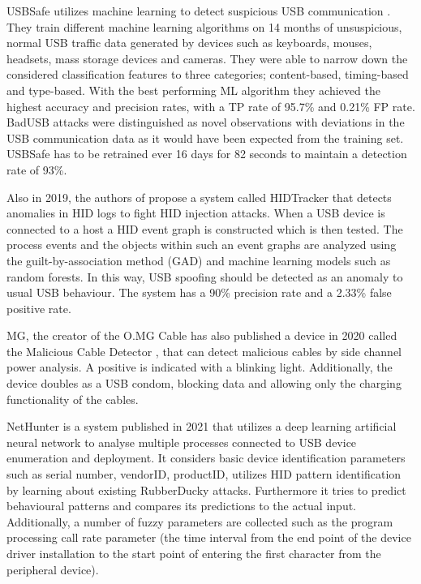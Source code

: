 USBSafe utilizes machine learning to detect suspicious USB communication \cite{kharrazUSBESAFEEndPointSolution2019}. They train different machine learning algorithms on 14 months of unsuspicious, normal USB traffic data generated by devices such as keyboards, mouses, headsets, mass storage devices and cameras. They were able to narrow down the considered classification features to three categories; content-based, timing-based and type-based. With the best performing ML algorithm they achieved the highest accuracy and precision rates, with a TP rate of 95.7\% and 0.21\% FP rate. BadUSB attacks were distinguished as novel observations with deviations in the USB communication data as it would have been expected from the training set. 
USBSafe has to be retrained ever 16 days for 82 seconds to maintain a detection rate of 93\%.

Also in 2019, the authors of \cite{IdentifyingHIDbasedAttacks2019} propose a system called HIDTracker that detects anomalies in HID logs to fight HID injection attacks. When a USB device is connected to a host a HID event graph is constructed which is then tested. The process events and the objects within such an event graphs are analyzed using the guilt-by-association method (GAD) and machine learning models such as random forests. In this way, USB spoofing should be detected as an anomaly to usual USB behaviour. The system has a 90\% precision rate and a 2.33\% false positive rate. 

MG, the creator of the O.MG Cable has also published a device in 2020 called the Malicious Cable Detector \cite{hak5MaliciousCableDetector}, that can detect malicious cables by side channel power analysis. A positive is indicated with a blinking light. Additionally, the device doubles as a USB condom, blocking data and allowing only the charging functionality of the cables. 

NetHunter \cite{IntelligentSystemPreventing} is a system published in 2021 that utilizes a deep learning artificial neural network to analyse multiple processes connected to USB device enumeration and deployment. It considers basic device identification parameters such as serial number, vendorID, productID, utilizes HID pattern identification by learning about existing RubberDucky attacks. Furthermore it tries to predict behavioural patterns and compares its predictions to the actual input. Additionally, a number of fuzzy parameters are collected such as the program processing call rate parameter (the time interval from the end point of the device driver installation to the start point of entering the first character from the peripheral device). 


